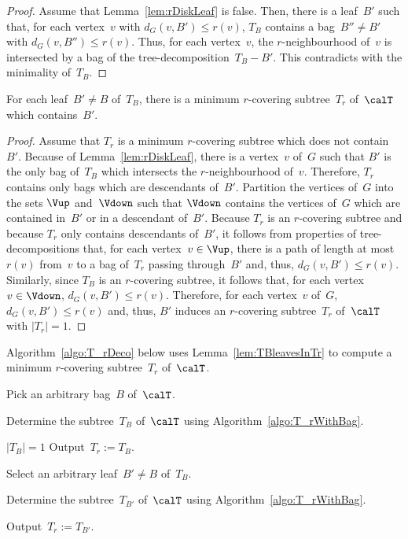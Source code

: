 \begin{proof}
Assume that Lemma~\ref{lem:rDiskLeaf} is false.
Then, there is a leaf~$B'$ such that, for each vertex~$v$ with $d_G(v, B') \leq r(v)$, $T_B$ contains a bag~$B'' \neq B'$ with $d_G(v, B'') \leq r(v)$.
Thus, for each vertex~$v$, the $r$-neighbourhood of~$v$ is intersected by a bag of the tree-decomposition~$T_B - B'$.
This contradicts with the minimality of~$T_B$.
\end{proof}

\begin{lemma}
    \label{lem:TBleavesInTr}
For each leaf~\( B' \neq B \) of~\( T_B \), there is a minimum $r$-covering subtree~\( T_r \) of~\( \calT \) which contains~\( B'\).
\end{lemma}

\begin{proof}
Assume that $T_r$ is a minimum $r$-covering subtree which does not contain~$B'$.
Because of Lemma~\ref{lem:rDiskLeaf}, there is a vertex~$v$ of~$G$ such that $B'$ is the only bag of~$T_B$ which intersects the $r$-neighbourhood of~$v$.
Therefore, $T_r$ contains only bags which are descendants of~$B'$.
Partition the vertices of~$G$ into the sets $\Vup$ and~$\Vdown$ such that $\Vdown$ contains the vertices of~$G$ which are contained in~$B'$ or in a descendant of~$B'$.
Because $T_r$ is an $r$-covering subtree and because $T_r$ only contains descendants of~$B'$, it follows from properties of tree-decompositions that, for each vertex~$v \in \Vup$, there is a path of length at most~$r(v)$ from~$v$ to a bag of~$T_r$ passing through~$B'$ and, thus, $d_G(v, B') \leq r(v)$.
Similarly, since $T_B$ is an $r$-covering subtree, it follows that, for each vertex~$v \in \Vdown$, $d_G(v, B') \leq r(v)$.
Therefore, for each vertex~$v$ of~$G$, $d_G(v, B') \leq r(v)$ and, thus, $B'$ induces an $r$-covering subtree~$T_r$ of~$\calT$ with $|T_r| = 1$.
\end{proof}

Algorithm~\ref{algo:T_rDeco} below uses Lemma~\ref{lem:TBleavesInTr} to compute a minimum $r$-covering subtree~$T_r$ of~$\calT$.

\begin{algorithm}
    [htb]
    \caption
    {%
        Computes a minimum $r$-covering subtree~$T_r$ of a given tree-decomposition~$\calT$.
    }
    \label{algo:T_rDeco}

Pick an arbitrary bag~$B$ of~$\calT$.

Determine the subtree~$T_B$ of~$\calT$ using Algorithm~\ref{algo:T_rWithBag}.

\If
{%
    \( |T_B| = 1 \)
}
{%
    Output~$T_r := T_B$.
}
\Else
{%
    Select an arbitrary leaf~$B' \neq B$ of~$T_B$.

    Determine the subtree~$T_{B'}$ of~$\calT$ using Algorithm~\ref{algo:T_rWithBag}.

    Output~$T_r := T_{B'}$.
}
\end{algorithm}

